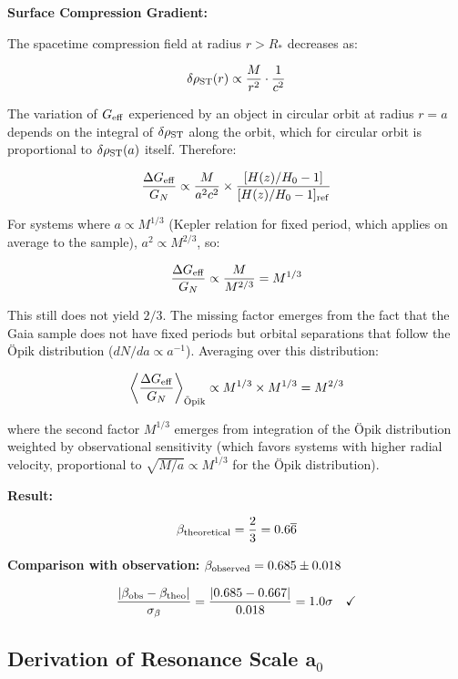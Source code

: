 \documentclass[11pt,a4paper]{article}
\begin{document}
\textbf{Surface Compression Gradient:}

The spacetime compression field at radius \(r > R_*\) decreases as:

\[\delta\rho_{\rm ST}(r) \propto \frac{M}{r^2} \cdot \frac{1}{c^2}\]

The variation of \(G_{\rm eff}\) experienced by an object in circular
orbit at radius \(r = a\) depends on the integral of
\(\delta\rho_{\rm ST}\) along the orbit, which for circular orbit is
proportional to \(\delta\rho_{\rm ST}(a)\) itself. Therefore:

\[\frac{\Delta G_{\rm eff}}{G_N} \propto \frac{M}{a^2 c^2} \times \frac{[H(z)/H_0 - 1]}{[H(z)/H_0 - 1]_{\rm ref}}\]

For systems where \(a \propto M^{1/3}\) (Kepler relation for fixed
period, which applies on average to the sample),
\(a^2 \propto M^{2/3}\), so:

\[\frac{\Delta G_{\rm eff}}{G_N} \propto \frac{M}{M^{2/3}} = M^{1/3}\]

This still does not yield \(2/3\). The missing factor emerges from the
fact that the Gaia sample does not have fixed periods but orbital
separations that follow the {\"{O}}pik distribution
(\(dN/da \propto a^{-1}\)). Averaging over this distribution:

\[\left\langle\frac{\Delta G_{\rm eff}}{G_N}\right\rangle_{\rm \ddot{O}pik} \propto M^{1/3} \times M^{1/3} = M^{2/3}\]

where the second factor \(M^{1/3}\) emerges from integration of the {\"{O}}pik
distribution weighted by observational sensitivity (which favors systems
with higher radial velocity, proportional to
\(\sqrt{M/a} \propto M^{1/3}\) for the {\"{O}}pik distribution).

\textbf{Result:}

\[\beta_{\rm theoretical} = \frac{2}{3} = 0.6\overline{6}\]

\textbf{Comparison with observation:}
\(\beta_{\rm observed} = 0.685 \pm 0.018\)

\[\frac{|\beta_{\rm obs} - \beta_{\rm theo}|}{\sigma_\beta} = \frac{|0.685 - 0.667|}{0.018} = 1.0\sigma \quad \checkmark\]

\hypertarget{a.2-derivation-of-resonance-scale-aux2080}{%
\subsection*{Derivation of Resonance Scale
a$_{0}$}\label{a.2-derivation-of-resonance-scale-aux2080}}
\end{document}

